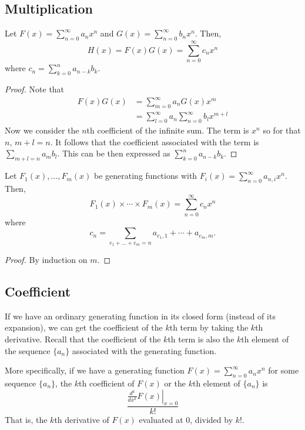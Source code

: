 \subsection{Multiplication}

\begin{theorem}
    Let $F(x) = \sum_{n=0}^\infty a_n x^n$ and $G(x) = \sum_{n=0}^\infty b_n x^n$. Then,
    $$
    H(x) = F(x) G(x) = \sum_{n=0}^\infty c_n x^n
    $$
    where $c_n = \sum_{k=0}^n a_{n-k} b_k$.
\end{theorem}

\begin{proof}
    Note that
    $$
    \begin{aligned}
        F(x) G(x) &= \sum_{m=0}^\infty a_n G(x) x^m \\
        &= \sum_{l=0}^\infty a_n \sum_{n=0}^\infty b_l x^{m+l}
    \end{aligned}
    $$
    Now we consider the $n$th coefficient of the infinite sum. The term is $x^n$ so for that $n$, $m + l = n$. It follows that the coefficient associated with the term is $\sum_{m+l = n} a_m b_l$. This can be then expressed as $\sum_{k=0}^n a_{n-k} b_{k}$.
\end{proof}

\begin{theorem}
    Let $F_1(x),\ldots,F_m(x)$ be generating functions with $F_i(x) = \sum_{n=0}^\infty a_{n,i} x^n$. Then, 
    $$
    F_1(x) \times \cdots \times F_m(x) = \sum_{n=0}^\infty c_n x^n
    $$
    where
    $$
    c_n = \sum_{e_1+\ldots+e_m = n} a_{e_1,1} + \cdots + a_{e_m,m}.
    $$
\end{theorem}

\begin{proof}
    By induction on $m$.
\end{proof}

\subsection{Coefficient}

If we have an ordinary generating function in its closed form (instead of its expansion), we can get the coefficient of the $k$th term by taking the $k$th derivative. Recall that the coefficient of the $k$th term is also the $k$th element of the sequence $\{a_n\}$ associated with the generating function.

More specifically, if we have a generating function $F(x) = \sum_{n=0}^\infty a_n x^n$ for some sequence $\{a_n\}$, the $k$th coefficient of $F(x)$ or the $k$th element of $\{a_n\}$ is
$$
\frac{\left. \frac{d^k}{dx^k} F(x) \right|_{x=0}}{k!}
$$
That is, the $k$th derivative of $F(x)$ evaluated at 0, divided by $k!$.

